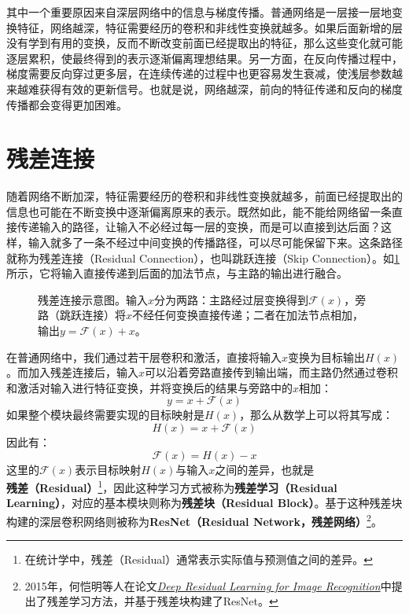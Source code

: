 其中一个重要原因来自深层网络中的信息与梯度传播。普通网络是一层接一层地变换特征，网络越深，特征需要经历的卷积和非线性变换就越多。如果后面新增的层没有学到有用的变换，反而不断改变前面已经提取出的特征，那么这些变化就可能逐层累积，使最终得到的表示逐渐偏离理想结果。另一方面，在反向传播过程中，梯度需要反向穿过更多层，在连续传递的过程中也更容易发生衰减，使浅层参数越来越难获得有效的更新信号。也就是说，网络越深，前向的特征传递和反向的梯度传播都会变得更加困难。

\section{残差连接}

随着网络不断加深，特征需要经历的卷积和非线性变换就越多，前面已经提取出的信息也可能在不断变换中逐渐偏离原来的表示。既然如此，能不能给网络留一条直接传递输入的路径，让输入不必经过每一层的变换，而是可以直接到达后面？这样，输入就多了一条不经过中间变换的传播路径，可以尽可能保留下来。这条路径就称为残差连接（Residual Connection），也叫跳跃连接（Skip Connection）。如\cref{fig:residual}所示，它将输入直接传递到后面的加法节点，与主路的输出进行融合。

\begin{figure}[H]
    \caption{残差连接示意图。输入$x$分为两路：主路经过层变换得到$\mathcal{F}(x)$，旁路（跳跃连接）将$x$不经任何变换直接传递；二者在加法节点相加，输出$y=\mathcal{F}(x)+x$。}
    \label{fig:residual}
\end{figure}

在普通网络中，我们通过若干层卷积和激活，直接将输入$x$变换为目标输出$H(x)$。而加入残差连接后，输入$x$可以沿着旁路直接传到输出端，而主路仍然通过卷积和激活对输入进行特征变换，并将变换后的结果与旁路中的$x$相加：
$$
y=x+\mathcal{F}(x)
$$
如果整个模块最终需要实现的目标映射是$H(x)$，那么从数学上可以将其写成：
$$
H(x)=x+\mathcal{F}(x)
$$
因此有：
$$
\mathcal{F}(x)=H(x)-x
$$
这里的$\mathcal{F}(x)$表示目标映射$H(x)$与输入$x$之间的差异，也就是\textbf{残差（Residual）}\footnote{在统计学中，残差（Residual）通常表示实际值与预测值之间的差异。}，因此这种学习方式被称为\textbf{残差学习（Residual Learning）}，对应的基本模块则称为\textbf{残差块（Residual Block）}。基于这种残差块构建的深层卷积网络则被称为\textbf{ResNet（Residual Network，残差网络）}\footnote{2015年，何恺明等人在论文\href{https://www.cv-foundation.org/openaccess/content_cvpr_2016/papers/He_Deep_Residual_Learning_CVPR_2016_paper.pdf}{\textit{Deep Residual Learning for Image Recognition}}中提出了残差学习方法，并基于残差块构建了ResNet。}。

